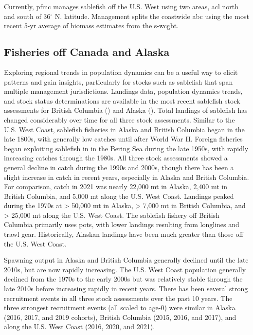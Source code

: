 \documentclass[
  english,
]{article}
\begin{document}
Currently, \gls{pfmc} manages sablefish off the U.S. West using two
areas, \gls{acl} north and south of 36\(^\circ\) N. latitude. Management
splits the coastwide \gls{abc} using the most recent 5-yr average of
biomass estimates from the \gls{s-wcgbt}.

\subsection{Fisheries off Canada and
Alaska}\label{fisheries-off-canada-and-alaska}

Exploring regional trends in population dynamics can be a useful way to
elicit patterns and gain insights, particularly for stocks such as
sablefish that span multiple management jurisdictions. Landings data,
population dynamics trends, and stock status determinations are
available in the most recent sablefish stock assessments for British
Columbia () and Alaska
(). Total
landings of sablefish has changed considerably over time for all three
stock assessments. Similar to the U.S. West Coast, sablefish fisheries
in Alaska and British Columbia began in the late 1800s, with generally
low catches until after World War II. Foreign fisheries began exploiting
sablefish in in the Bering Sea during the late 1950s, with rapidly
increasing catches through the 1980s. All three stock assessments showed
a general decline in catch during the 1990s and 2000s, though there has
been a slight increase in catch in recent years, especially in Alaska
and British Columbia. For comparison, catch in 2021 was nearly 22,000 mt
in Alaska, 2,400 mt in British Columbia, and 5,000 mt along the U.S.
West Coast. Landings peaked during the 1970s at \textgreater{} 50,000 mt
in Alaska, \textgreater{} 7,000 mt in British Columbia, and
\textgreater{} 25,000 mt along the U.S. West Coast. The sablefish
fishery off British Columbia primarily uses pots, with lower landings
resulting from longlines and trawl gear. Historically, Alaskan landings
have been much greater than those off the U.S. West Coast.

Spawning output in Alaska and British Columbia generally declined until
the late 2010s, but are now rapidly increasing. The U.S. West Coast
population generally declined from the 1970s to the early 2000s but was
relatively stable through the late 2010s before increasing rapidly in
recent years. There has been several strong recruitment events in all
three stock assessments over the past 10 years. The three strongest
recruitment events (all scaled to age-0) were similar in Alaska (2016,
2017, and 2019 cohorts), British Columbia (2015, 2016, and 2017), and
along the U.S. West Coast (2016, 2020, and 2021).
\end{document}
